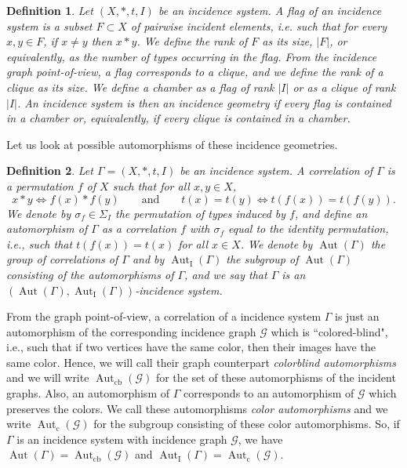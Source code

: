 \documentclass[10pt,a4paper]{amsart}
\newtheorem{definition}{Definition}
\newcommand{\Aut}{\operatorname{Aut}}
\newcommand{\AutI}{\Aut_{\text{I}}}
\newcommand{\Autc}{\Aut_{\text{c}}}
\newcommand{\Autcb}{\Aut_{\text{cb}}}
\newcommand{\G}{\mathcal{G}}
\begin{document}
\begin{definition}
Let $(X,\ast,t,I)$ be an incidence system. 
A \emph{flag} of an incidence system is a subset $F\subset X$ of pairwise incident elements, i.e. such that for every $x,y\in F$, if $x\neq y$ then $x\ast y$. We define the \emph{rank} of $F$ as its size,  $|F|$, or equivalently, as the number of types occurring in the flag. From the incidence graph point-of-view, a flag corresponds to a clique, and we define the \emph{rank} of a clique as its size. We define a \emph{chamber} as a flag of rank $|I|$ or as a clique of rank $|I|$. An incidence system is then an \emph{incidence geometry} if every flag is contained in a chamber or, equivalently, if every clique is contained in a chamber.
\end{definition}

Let us look at possible automorphisms of these incidence geometries.

\begin{definition}
Let $\Gamma=(X,\ast,t,I)$ be an incidence system. A \emph{correlation} of $\Gamma$ is a permutation $f$ of $X$ such that for all $x,y\in X$, 
\[ 
x\ast y\Leftrightarrow f(x)\ast f(y)\qquad \text{and}\qquad t(x)=t(y)\Leftrightarrow t(f(x))=t(f(y)).
\]
We denote by $\sigma_f\in \Sigma_I$ the permutation of types induced by $f$, and define an \emph{automorphism} of $\Gamma$ as a correlation $f$ with $\sigma_f$ equal to the identity permutation, i.e., such that $t(f(x))=t(x)$ for all $x\in X$. We denote by $\Aut(\Gamma)$ the group of correlations of $\Gamma$ and by $\AutI(\Gamma)$ the subgroup of $\Aut(\Gamma)$ consisting of the automorphisms of $\Gamma$, and we say that $\Gamma$ is an $(\Aut(\Gamma),\AutI(\Gamma))$-incidence system.
\end{definition}

From the graph point-of-view, a correlation of a incidence system $\Gamma$ is just an automorphism of the corresponding incidence graph $\G$ which is ``colored-blind", i.e., such that if two vertices have the same color, then their images have the same color.  Hence, we will call their graph counterpart \emph{colorblind automorphisms} and we will write $\Aut_{\text{cb}}(\G)$ for the set of these automorphisms of the incident graphs. Also, an automorphism of $\Gamma$ corresponds to an automorphism of $\G$ which preserves the colors. We call these automorphisms \emph{color automorphisms} and we write $\Autc(\G)$ for the subgroup consisting of these color automorphisms. So, if $\Gamma$ is an incidence system with incidence graph $\G$, we have $\Aut(\Gamma)=\Autcb(\G)$ and $\AutI(\Gamma)=\Autc(\G)$.
\end{document}
